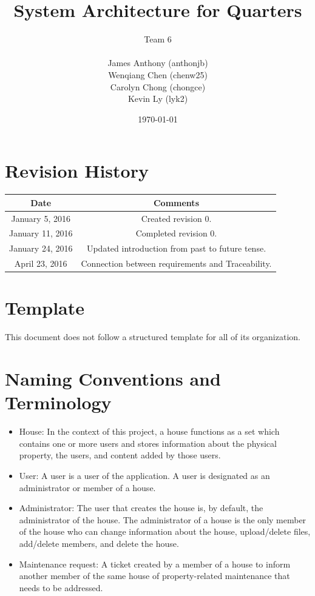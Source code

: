 \documentclass[12pt]{article}
\begin{document}
\title{System Architecture for Quarters}
\author{Team 6\\ \\James Anthony (anthonjb)\\ Wenqiang Chen (chenw25)\\ Carolyn Chong
(chongce)\\ Kevin Ly (lyk2)}
\date{\today}

\maketitle

\pagebreak

\tableofcontents
\listoffigures

\section*{Revision History}
\begin{tabular}{|c|c|}
\hline
\textbf{Date}  & \textbf{Comments} \\ \hline
January 5, 2016 & Created revision 0. \\ \hline
January 11, 2016 & Completed revision 0. \\
\hline
January 24, 2016 & Updated introduction from past to future tense. \\
\hline
April 23, 2016 & Connection between requirements and Traceability. \\
\hline
\end{tabular}

\section*{Template}
This document does not follow a structured template for all of its organization.

\pagebreak
\section*{Naming Conventions and Terminology}
    \begin{itemize}
    \item House: In the context of this project, a house functions as a set
      which contains one or more users and stores information about the
      physical property, the users, and content added by those users.
    \item User: A user is a user of the application. A user is designated as an administrator or member of a house.
    \item Administrator: The user that creates the house is, by default, the administrator of the house. The administrator of a house is the only member of the house who can change information about the house, upload/delete files, add/delete members, and delete the house.
    \item Maintenance request: A ticket created by a member of a house to inform another member of the same house of property-related maintenance that needs to be addressed.
    \end{itemize}
\end{document}
